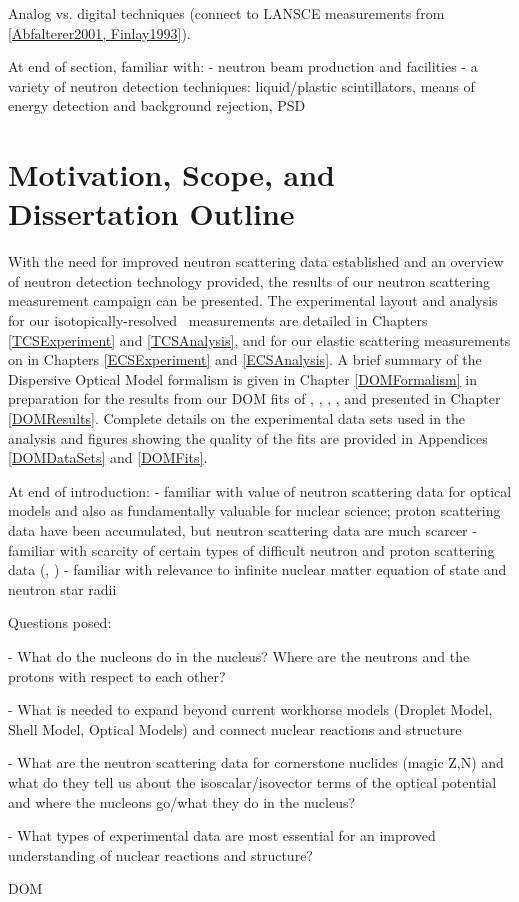 Analog vs. digital techniques (connect to LANSCE measurements from \ref{Abfalterer2001, Finlay1993}).

At end of section, familiar with:
- neutron beam production and facilities
- a variety of neutron detection techniques: liquid/plastic scintillators,
means of energy detection and background rejection, PSD

\section{Motivation, Scope, and Dissertation Outline}
With the need for improved neutron scattering data established and an overview of neutron
detection technology provided, the results of our neutron scattering measurement campaign can be
presented. The experimental layout and analysis for our isotopically-resolved \tot\ measurements are 
detailed
in Chapters \ref{TCSExperiment} and \ref{TCSAnalysis}, and for our elastic scattering measurements 
on \snTwelveFour in Chapters \ref{ECSExperiment} and \ref{ECSAnalysis}. A brief summary of the 
Dispersive Optical Model formalism is
given in Chapter \ref{DOMFormalism} in preparation for the results from our DOM fits of \oSixEight, \caAughtEight, 
\niEightFour, \snTwelveFour, and \pbEight presented in Chapter \ref{DOMResults}. Complete
details on the experimental data sets used in the analysis and figures showing the quality of the
fits are provided in Appendices \ref{DOMDataSets} and \ref{DOMFits}. 

At end of introduction:
- familiar with value of neutron scattering data for optical models and also as
fundamentally valuable for nuclear science; proton scattering data have been
accumulated, but neutron scattering data are much scarcer
- familiar with scarcity of certain types of difficult neutron and proton
scattering data (\tot, \rxnE)
- familiar with relevance to infinite nuclear matter equation of state and
neutron star radii

Questions posed:

- What do the nucleons do in the nucleus? Where are the neutrons and the protons
with respect to each other?

- What is needed to expand beyond current workhorse models (Droplet Model,
Shell Model, Optical Models) and connect nuclear reactions and structure

- What are the neutron scattering data for cornerstone nuclides (magic Z,N) and
what do they tell us about the isoscalar/isovector terms of the optical
potential and where the nucleons go/what they do in the nucleus?

- What types of experimental data are most essential for an improved understanding of nuclear
reactions and structure?

\gls{DOM}


%

